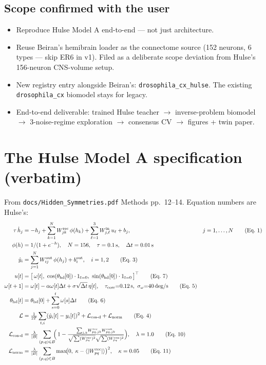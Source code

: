 \documentclass[11pt]{article}
\begin{document}
\subsection*{Scope confirmed with the user}

\begin{itemize}[leftmargin=*]
\item Reproduce Hulse Model A end-to-end --- not just architecture.
\item Reuse Beiran's hemibrain loader as the connectome source (152
  neurons, 6 types --- skip ER6 in v1). Filed as a deliberate scope
  deviation from Hulse's 156-neuron CNS-volume setup.
\item New registry entry alongside Beiran's: \texttt{drosophila\_cx\_hulse}.
  The existing \texttt{drosophila\_cx} biomodel stays for legacy.
\item End-to-end deliverable: trained Hulse teacher $\to$ inverse-problem
  biomodel $\to$ 3-noise-regime exploration $\to$ consensus CV $\to$ figures +
  twin paper.
\end{itemize}

\section{The Hulse Model A specification (verbatim)}
\label{sec:spec}

From \texttt{docs/Hidden\_Symmetries.pdf} Methods pp.~12--14.
Equation numbers are Hulse's:
\begin{align}
\tau\,\dot h_j &= -h_j
   + \sum_{k=1}^{N} W^{\text{rec}}_{jk}\,\phi(h_k)
   + \sum_{\ell=1}^{3} W^{\text{in}}_{j,\ell}\,u_\ell
   + b_j,
   && j=1,\ldots,N \tag{Eq.\ 1} \\
\phi(h) &= 1/(1+e^{-h}),\quad N=156,\quad \tau=0.1\,\text{s},\quad \Delta t=0.01\,\text{s} \\
\hat{y}_i &= \sum_{j=1}^{N} W^{\text{out}}_{ij}\,\phi(h_j) + b^{\text{out}}_i,
            \quad i=1,2 \tag{Eq.\ 3} \\
u[t] &= \bigl[\,\omega[t],\ \cos(\theta_{\text{hd}}[0])\cdot 1_{t=0},\
                       \sin(\theta_{\text{hd}}[0])\cdot 1_{t=0}\,\bigr]^\top \tag{Eq.\ 7} \\
\omega[t+1] &= \omega[t] - \alpha\omega[t]\Delta t + \sigma\sqrt{\Delta t}\,\eta[t],
            \quad \tau_{\text{corr}}{=}0.12\,\text{s},\ \sigma_\omega{=}40\,\text{deg/s} \tag{Eq.\ 5} \\
\theta_{\text{hd}}[t] &= \theta_{\text{hd}}[0]+\sum_{s=0}^{t}\omega[s]\Delta t \tag{Eq.\ 6} \\
\mathcal{L} &= \tfrac{1}{2T}\sum_{t,i} (\hat{y}_i[t]-y_i[t])^2 + \mathcal{L}_{\text{cos-d}} + \mathcal{L}_{\text{norm}} \tag{Eq.\ 4} \\
\mathcal{L}_{\text{cos-d}} &= \tfrac{\lambda}{|B|}\sum_{(p,q)\in B}\!\!
    \Bigl(\,1 - \tfrac{\sum_{j,k}\!W^{\text{rec}}_{pq,jk}W^{\text{con}}_{pq,jk}}
              {\sqrt{\sum(W^{\text{rec}}_{pq})^2}\sqrt{\sum(W^{\text{con}}_{pq})^2}}\Bigr),
    \quad \lambda=1.0 \tag{Eq.\ 10} \\
\mathcal{L}_{\text{norm}} &= \tfrac{\lambda}{|B|}\sum_{(p,q)\in B}
   \max\!\bigl(0,\;\kappa-\langle|W^{\text{rec}}_{pq}|\rangle\bigr)^2,
   \quad \kappa=0.05 \tag{Eq.\ 11}
\end{align}
\end{document}
